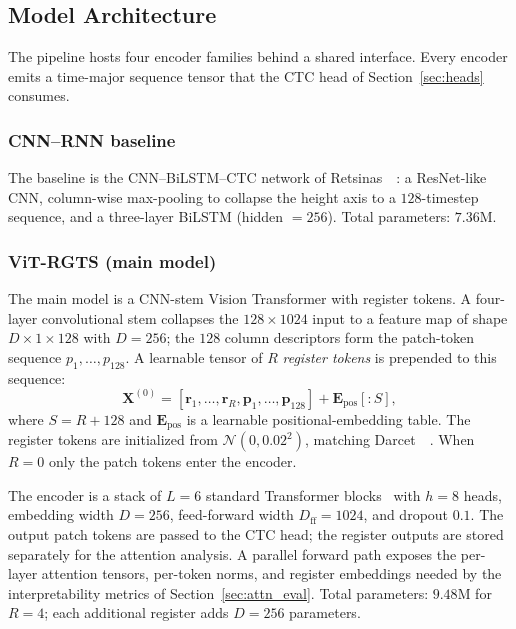 \subsection{Model Architecture}
\label{sec:arch}

The pipeline hosts four encoder families behind a shared interface. Every encoder emits a time-major sequence tensor that the CTC head of Section~\ref{sec:heads} consumes.

\subsubsection{CNN--RNN baseline}

The baseline is the CNN--BiLSTM--CTC network of Retsinas~\etal~\cite{retsinas2022htrbestpractices}: a ResNet-like CNN, column-wise max-pooling to collapse the height axis to a $128$-timestep sequence, and a three-layer BiLSTM (hidden $= 256$). Total parameters: $7.36$M.

\subsubsection{ViT-RGTS (main model)}

The main model is a CNN-stem Vision Transformer with register tokens. A four-layer convolutional stem collapses the $128 \times 1024$ input to a feature map of shape $D \times 1 \times 128$ with $D = 256$; the $128$ column descriptors form the patch-token sequence $p_1, \ldots, p_{128}$. A learnable tensor of $R$ \emph{register tokens} is prepended to this sequence:
\begin{equation}
\label{eq:token_sequence}
\mathbf{X}^{(0)} = [\mathbf{r}_1, \ldots, \mathbf{r}_R, \mathbf{p}_1, \ldots, \mathbf{p}_{128}] + \mathbf{E}_{\mathrm{pos}}[:S],
\end{equation}
where $S = R + 128$ and $\mathbf{E}_{\mathrm{pos}}$ is a learnable positional-embedding table. The register tokens are initialized from $\mathcal{N}(0, 0.02^2)$, matching Darcet~\etal~\cite{darcet2024registers}. When $R = 0$ only the patch tokens enter the encoder.

The encoder is a stack of $L = 6$ standard Transformer blocks~\cite{vaswani2017attention} with $h = 8$ heads, embedding width $D = 256$, feed-forward width $D_{\mathrm{ff}} = 1024$, and dropout $0.1$. The output patch tokens are passed to the CTC head; the register outputs are stored separately for the attention analysis. A parallel forward path exposes the per-layer attention tensors, per-token norms, and register embeddings needed by the interpretability metrics of Section~\ref{sec:attn_eval}. Total parameters: $9.48$M for $R = 4$; each additional register adds $D = 256$ parameters.

